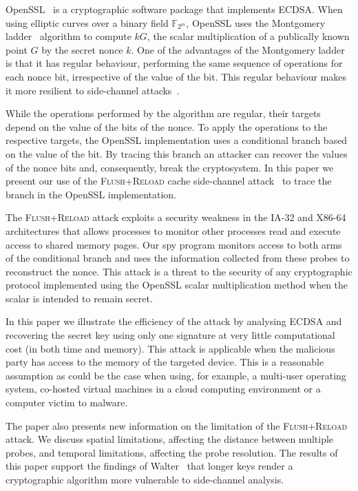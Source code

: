 \documentclass[twocolumn]{svjour3}
\begin{document}
OpenSSL~\cite{openssl} is a cryptographic software package that implements ECDSA.
When using elliptic curves over a binary field $\mathbb{F}_{2^m}$, OpenSSL uses the 
Montgomery ladder~\cite{montgomery87speeding,joye03montgomery} algorithm to compute $kG$, the scalar multiplication of a publically known point $G$ by the secret nonce $k$.
One of the advantages of the Montgomery ladder is that it has regular behaviour, performing
the same sequence of operations for each nonce bit, irrespective of the value of the bit.
This regular behaviour makes it more resilient to side-channel attacks~\cite{joye03montgomery,okeya00elliptic}.

While the operations performed by the algorithm are regular, their targets depend on the value of the bits of the nonce.
To apply the operations to the respective targets, the OpenSSL implementation uses a conditional branch based on the value of the bit. By tracing this branch an attacker can recover the values of the nonce bits and, consequently, break the cryptosystem. In this paper we present our use of the \textsc{Flush+Reload} cache side-channel attack~\cite{yarom13flush} to trace the branch in the OpenSSL implementation.

The \textsc{Flush+Reload} attack exploits a security weakness in the IA-32 and X86-64 architectures that allows processes
to monitor other processes read and execute access to shared memory pages.
Our spy program monitors access to both arms of the conditional branch and uses the information
collected from these probes to reconstruct the nonce. This attack is a threat to the security of any cryptographic protocol implemented using the OpenSSL scalar multiplication method when the scalar is intended to remain secret.

In this paper we illustrate the efficiency of the attack by analysing ECDSA and recovering the secret key using only one signature at very little computational cost (in both time and memory). This attack is applicable when the malicious party has access to the memory of the targeted device.
This is  a reasonable assumption as could be the case when using, for example, a multi-user operating system, co-hosted virtual machines in a cloud computing environment or a computer victim to malware. 

The paper also presents new information on the limitation of the \textsc{Flush+Reload} attack.
We discuss spatial limitations, affecting the distance between multiple probes, and 
temporal limitations, affecting the probe resolution.
The results of this paper support the findings of Walter~\cite{walter04longer} that longer keys render a cryptographic algorithm more vulnerable to side-channel analysis.
\end{document}
